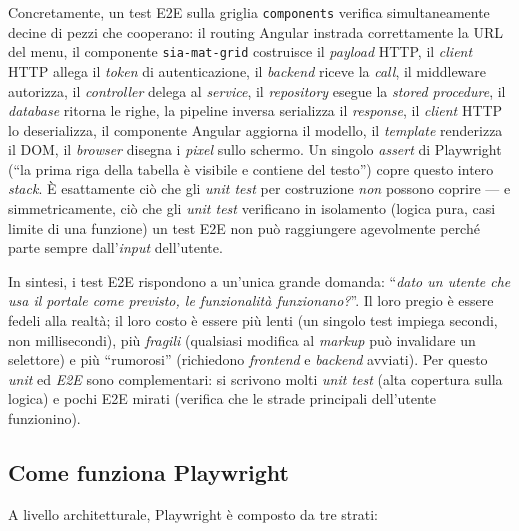 Concretamente, un test E2E sulla griglia \texttt{components} verifica simultaneamente decine di pezzi che cooperano: il routing Angular instrada correttamente la URL del menu, il componente \texttt{sia-mat-grid} costruisce il \emph{payload} HTTP, il \emph{client} HTTP allega il \emph{token} di autenticazione, il \emph{backend} riceve la \emph{call}, il middleware autorizza, il \emph{controller} delega al \emph{service}, il \emph{repository} esegue la \emph{stored procedure}, il \emph{database} ritorna le righe, la pipeline inversa serializza il \emph{response}, il \emph{client} HTTP lo deserializza, il componente Angular aggiorna il modello, il \emph{template} renderizza il DOM, il \emph{browser} disegna i \emph{pixel} sullo schermo. Un singolo \emph{assert} di Playwright (``la prima riga della tabella è visibile e contiene del testo'') copre questo intero \emph{stack}. È esattamente ciò che gli \emph{unit test} per costruzione \emph{non} possono coprire — e simmetricamente, ciò che gli \emph{unit test} verificano in isolamento (logica pura, casi limite di una funzione) un test E2E non può raggiungere agevolmente perché parte sempre dall'\emph{input} dell'utente.

In sintesi, i test E2E rispondono a un'unica grande domanda: ``\emph{dato un utente che usa il portale come previsto, le funzionalità funzionano?}''. Il loro pregio è essere fedeli alla realtà; il loro costo è essere più lenti (un singolo test impiega secondi, non millisecondi), più \emph{fragili} (qualsiasi modifica al \emph{markup} può invalidare un selettore) e più ``rumorosi'' (richiedono \emph{frontend} e \emph{backend} avviati). Per questo \emph{unit} ed \emph{E2E} sono complementari: si scrivono molti \emph{unit test} (alta copertura sulla logica) e pochi E2E mirati (verifica che le strade principali dell'utente funzionino).

\subsection{Come funziona Playwright}

A livello architetturale, Playwright è composto da tre strati:

